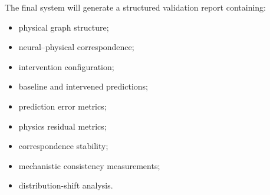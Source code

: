 \documentclass[12pt,singleside,a4paper]{article}
\begin{document}
The final system will generate a structured validation report
containing:

\begin{itemize}
    \item physical graph structure;
    \item neural--physical correspondence;
    \item intervention configuration;
    \item baseline and intervened predictions;
    \item prediction error metrics;
    \item physics residual metrics;
    \item correspondence stability;
    \item mechanistic consistency measurements;
    \item distribution-shift analysis.
\end{itemize}
\pagebreak  

\nocite{*}

\end{document}
